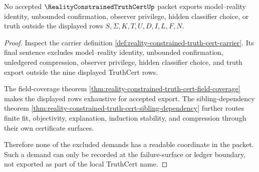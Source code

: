 \begin{theorem}
\label{thm:reality-constrained-truth-cert-nonescape}
No accepted $\RealityConstrainedTruthCertUp$ packet exports model--reality
identity, unbounded confirmation, observer privilege, hidden classifier choice,
or truth outside the displayed rows $S,\Sigma,K,T,U,D,I,L,F,N$.
\end{theorem}
\begin{proof}
Inspect the carrier definition
\autoref{def:reality-constrained-truth-cert-carrier}. Its final sentence
excludes model--reality identity, unbounded confirmation, unledgered
compression, observer privilege, hidden classifier choice, and truth export
outside the nine displayed TruthCert rows.

The field-coverage theorem
\autoref{thm:reality-constrained-truth-cert-field-coverage} makes the displayed
rows exhaustive for accepted export. The sibling-dependency theorem
\autoref{thm:reality-constrained-truth-cert-sibling-dependency} further routes
finite fit, objectivity, explanation, induction stability, and compression
through their own certificate surfaces.

Therefore none of the excluded demands has a readable coordinate in the packet.
Such a demand can only be recorded at the failure-surface or ledger boundary,
not exported as part of the local TruthCert name.
\end{proof}

